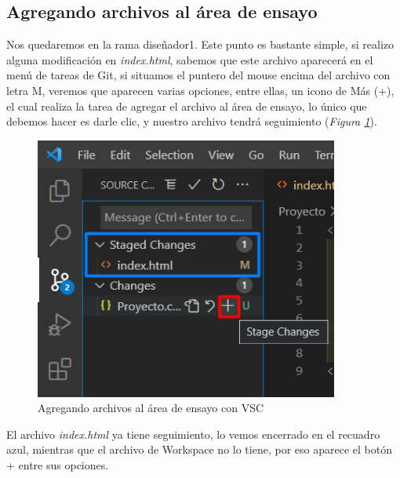 \subsection{Agregando archivos al área de ensayo}
\hspace{0.55cm}Nos quedaremos en la rama diseñador1. Este punto es bastante simple, si realizo alguna modificación en \textit{index.html}, sabemos que este archivo aparecerá en el menú de tareas de Git, si situamos el puntero del mouse encima del archivo con letra M, veremos que aparecen varias opciones, entre ellas, un icono de Más (+), el cual realiza la tarea de agregar el archivo al área de ensayo, lo único que debemos hacer es darle clic, y nuestro archivo tendrá seguimiento (\textit{Figura \ref{fig: 20}}).
\begin{figure}[H]
    \centering
    \caption{Agregando archivos al área de ensayo con VSC}
    \label{fig: 20}
    \includegraphics[width=10cm]{capturas/seguimiento_archivos.png}
\end{figure}

El archivo \textit{index.html} ya tiene seguimiento, lo vemos encerrado en el recuadro azul, mientras que el archivo de Workspace no lo tiene, por eso aparece el botón + entre sus opciones.


